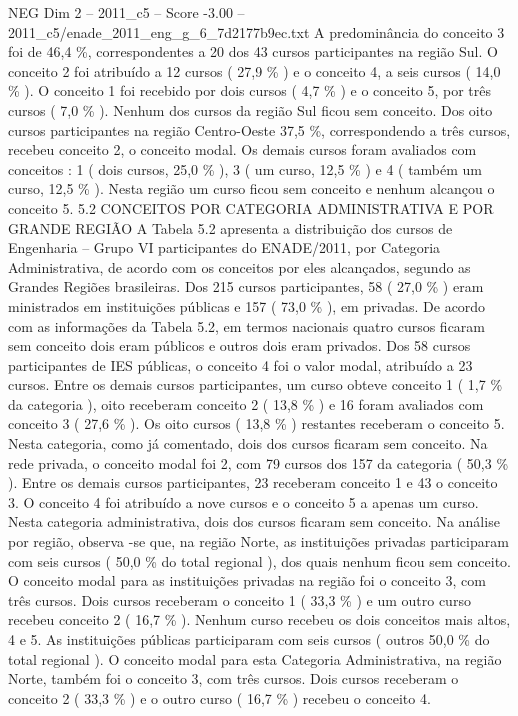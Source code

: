 \begin{textsample}{NEG Dim 2 – 2011\_c5 – Score -3.00 – 2011\_c5/enade\_2011\_eng\_g\_6\_7d2177b9ec.txt}
A predominância do conceito 3 foi de 46,4 \%, correspondentes a 20 dos 43 cursos participantes na região Sul.
O conceito 2 foi atribuído a 12 cursos ( 27,9 \% ) e o conceito 4, a seis cursos ( 14,0 \% ).
O conceito 1 foi recebido por dois cursos ( 4,7 \% ) e o conceito 5, por três cursos ( 7,0 \% ).
Nenhum dos cursos da região Sul ficou sem conceito.
Dos oito cursos participantes na região Centro-Oeste 37,5 \%, correspondendo a três cursos, recebeu conceito 2, o conceito modal.
Os demais cursos foram avaliados com conceitos : 1 ( dois cursos, 25,0 \% ), 3 ( um curso, 12,5 \% ) e 4 ( também um curso, 12,5 \% ).
Nesta região um curso ficou sem conceito e nenhum alcançou o conceito 5. 5.2 CONCEITOS POR CATEGORIA ADMINISTRATIVA E POR GRANDE REGIÃO A Tabela 5.2 apresenta a distribuição dos cursos de Engenharia – Grupo VI participantes do ENADE/2011, por Categoria Administrativa, de acordo com os conceitos por eles alcançados, segundo as Grandes Regiões brasileiras.
Dos 215 cursos participantes, 58 ( 27,0 \% ) eram ministrados em instituições públicas e 157 ( 73,0 \% ), em privadas.
De acordo com as informações da Tabela 5.2, em termos nacionais quatro cursos ficaram sem conceito dois eram públicos e outros dois eram privados.
Dos 58 cursos participantes de IES públicas, o conceito 4 foi o valor modal, atribuído a 23 cursos.
Entre os demais cursos participantes, um curso obteve conceito 1 ( 1,7 \% da categoria ), oito receberam conceito 2 ( 13,8 \% ) e 16 foram avaliados com conceito 3 ( 27,6 \% ).
Os oito cursos ( 13,8 \% ) restantes receberam o conceito 5.
Nesta categoria, como já comentado, dois dos cursos ficaram sem conceito.
Na rede privada, o conceito modal foi 2, com 79 cursos dos 157 da categoria ( 50,3 \% ).
Entre os demais cursos participantes, 23 receberam conceito 1 e 43 o conceito 3.
O conceito 4 foi atribuído a nove cursos e o conceito 5 a apenas um curso.
Nesta categoria administrativa, dois dos cursos ficaram sem conceito.
Na análise por região, observa -se que, na região Norte, as instituições privadas participaram com seis cursos ( 50,0 \% do total regional ), dos quais nenhum ficou sem conceito.
O conceito modal para as instituições privadas na região foi o conceito 3, com três cursos.
Dois cursos receberam o conceito 1 ( 33,3 \% ) e um outro curso recebeu conceito 2 ( 16,7 \% ).
Nenhum curso recebeu os dois conceitos mais altos, 4 e 5.
As instituições públicas participaram com seis cursos ( outros 50,0 \% do total regional ).
O conceito modal para esta Categoria Administrativa, na região Norte, também foi o conceito 3, com três cursos.
Dois cursos receberam o conceito 2 ( 33,3 \% ) e o outro curso ( 16,7 \% ) recebeu o conceito 4.

\end{textsample}
